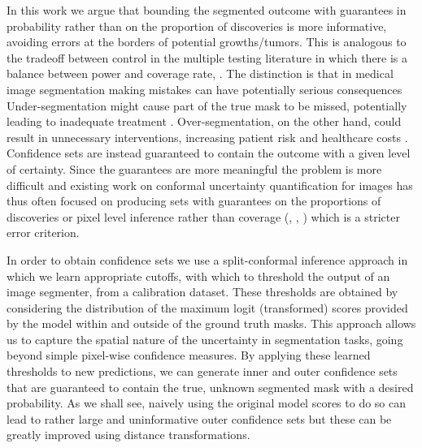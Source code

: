 In this work we argue that bounding the segmented outcome with guarantees in probability rather than on the proportion of discoveries is more informative, avoiding errors at the borders of potential growths/tumors. This is analogous to the tradeoff between  control in the multiple testing literature in which there is a balance between power and coverage rate, . The distinction is that in medical image segmentation making mistakes can have potentially serious consequences Under-segmentation might cause part of the true mask to be missed, potentially leading to inadequate treatment \citep{Jalalifar2022}. Over-segmentation, on the other hand, could result in unnecessary interventions, increasing patient risk and healthcare costs \citep{Gupta2020, Patz2014}. Confidence sets are instead guaranteed to contain the outcome with a given level of certainty. Since the guarantees are more meaningful the problem is more difficult and existing work on conformal uncertainty quantification for images has thus often focused on producing sets with guarantees on the proportions of discoveries or pixel level inference rather than coverage (\cite{Bates2021}, \cite{Wieslander2020}, \cite{Mossina2024}) which is a stricter error criterion. 

In order to obtain confidence sets we use a split-conformal inference approach in which we learn appropriate cutoffs, with which to threshold the output of an image segmenter, from a calibration dataset. These thresholds are obtained by considering the distribution of the maximum logit (transformed) scores provided by the model within and outside of the ground truth masks. This approach allows us to capture the spatial nature of the uncertainty in segmentation tasks, going beyond simple pixel-wise confidence measures. By applying these learned thresholds to new predictions, we can generate inner and outer confidence sets that are guaranteed to contain the true, unknown segmented mask with a desired probability. As we shall see, naively using the original model scores to do so can lead to rather large and uninformative outer confidence sets but these can be greatly improved using distance transformations. 
 
